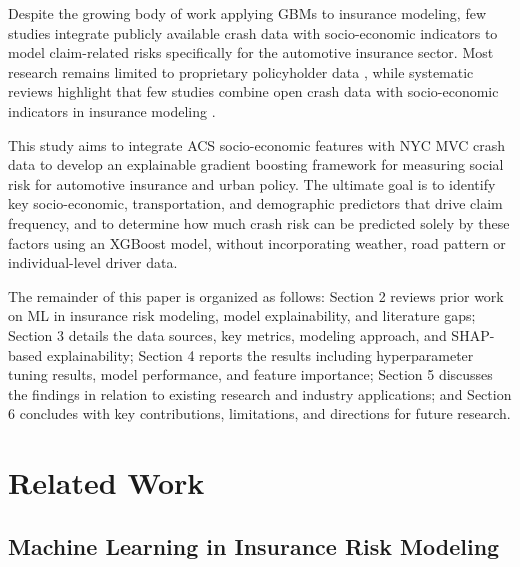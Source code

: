 \documentclass[
  number,
  review,
  3p]{elsarticle}
\begin{document}
Despite the growing body of work applying GBMs to insurance modeling,
few studies integrate publicly available crash data with socio-economic
indicators to model claim-related risks specifically for the automotive
insurance sector. Most research remains limited to proprietary
policyholder data \citep{henckaerts, mohamed}, while systematic reviews
highlight that few studies combine open crash data with socio-economic
indicators in insurance modeling \citep{ali, behboudi}.

This study aims to integrate ACS socio-economic features with NYC MVC
crash data to develop an explainable gradient boosting framework for
measuring social risk for automotive insurance and urban policy. The
ultimate goal is to identify key socio-economic, transportation, and
demographic predictors that drive claim frequency, and to determine how
much crash risk can be predicted solely by these factors using an
XGBoost model, without incorporating weather, road pattern or
individual-level driver data.

The remainder of this paper is organized as follows: Section 2 reviews
prior work on ML in insurance risk modeling, model explainability, and
literature gaps; Section 3 details the data sources, key metrics,
modeling approach, and SHAP-based explainability; Section 4 reports the
results including hyperparameter tuning results, model performance, and
feature importance; Section 5 discusses the findings in relation to
existing research and industry applications; and Section 6 concludes
with key contributions, limitations, and directions for future research.

\section{Related Work}\label{sec-lit-review}

\subsection{\texorpdfstring{\textbf{Machine Learning in Insurance Risk
Modeling}}{Machine Learning in Insurance Risk Modeling}}\label{machine-learning-in-insurance-risk-modeling}
\end{document}
